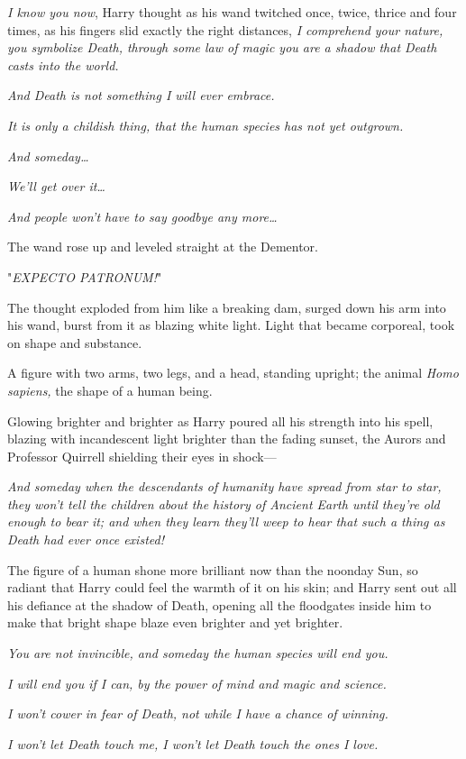 \emph{I know you now}, Harry thought as his wand twitched once, twice, thrice
and four times, as his fingers slid exactly the right distances, \emph{I
comprehend your nature, you symbolize Death, through some law of magic you are
a shadow that Death casts into the world.}

\emph{And Death is not something I will ever embrace.}

\emph{It is only a childish thing, that the human species has not yet outgrown.}

\emph{And someday{\ldots}}

\emph{We'll get over it{\ldots}}

\emph{And people won't have to say goodbye any more{\ldots}}

The wand rose up and leveled straight at the Dementor.

"\emph{EXPECTO PATRONUM!}"

The thought exploded from him like a breaking dam, surged down his arm into his
wand, burst from it as blazing white light. Light that became corporeal, took
on shape and substance.

A figure with two arms, two legs, and a head, standing upright; the animal
\emph{Homo sapiens,} the shape of a human being.

Glowing brighter and brighter as Harry poured all his strength into his spell,
blazing with incandescent light brighter than the fading sunset, the Aurors and
Professor Quirrell shielding their eyes in shock---

\emph{And someday when the descendants of humanity have spread from star to
star, they won't tell the children about the history of Ancient Earth until
they're old enough to bear it; and when they learn they'll weep to hear that
such a thing as Death had ever once existed!}

The figure of a human shone more brilliant now than the noonday Sun, so radiant
that Harry could feel the warmth of it on his skin; and Harry sent out all his
defiance at the shadow of Death, opening all the floodgates inside him to make
that bright shape blaze even brighter and yet brighter.

\emph{You are not invincible, and someday the human species will end you.}

\emph{I will end you if I can, by the power of mind and magic and science.}

\emph{I won't cower in fear of Death, not while I have a chance of winning.}

\emph{I won't let Death touch me, I won't let Death touch the ones I love.}

